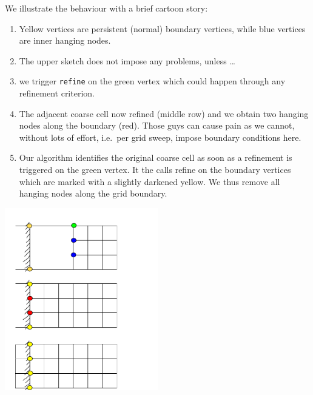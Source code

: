 \noindent
We illustrate the behaviour with a brief cartoon story:
\begin{enumerate}
  \item Yellow vertices are persistent (normal) boundary vertices, while blue
  vertices are inner hanging nodes.
  \item The upper sketch does not impose any problems, unless \ldots
  \item we trigger \texttt{refine} on the green vertex which could happen
  through any refinement criterion.
  \item The adjacent coarse cell now refined (middle row) and we obtain two
  hanging nodes along the boundary (red). Those guys can cause pain as we
  cannot, without lots of effort, i.e.~per grid sweep, impose boundary
  conditions here.
  \item Our algorithm identifies the original coarse cell as soon as a
  refinement is triggered on the green vertex. It the calls refine on the
  boundary vertices which are marked with a slightly darkened yellow. We thus
  remove all hanging nodes along the grid boundary.
\end{enumerate}

\begin{center}
  \includegraphics[width=0.5\textwidth]{98_patterns/boundaries-without-hanging-nodes.pdf}
\end{center}

